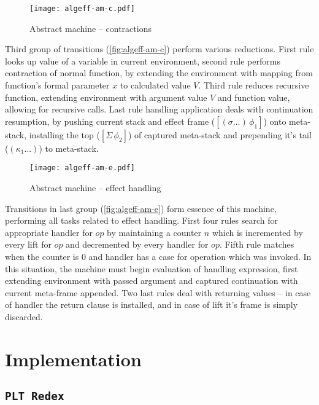\documentclass[inz, english, shortabstract]{iithesis}
\newcommand{\Redex}{\texttt{PLT Redex}}
\begin{document}
\begin{figure}[h]
  \centering 
  \texttt{[image: algeff-am-c.pdf]}
  \caption{Abstract machine -- contractions}
  \label{fig:algeff-am-c}
\end{figure}

Third group of transitions (\autoref{fig:algeff-am-c}) perform various reductions.
First rule looks up value of a variable in current environment, second rule performs contraction of normal function, by extending the environment with mapping from function's formal parameter $ x $ to calculated value $ V $.
Third rule reduces recursive function, extending environment with argument value $ V $ and function value, allowing for recursive calls.
Last rule handling application deals with continuation resumption, by pushing current stack and effect frame ($ [(\sigma \ldots) \, \phi_1] $) onto meta-stack, installing the top ($ [\Sigma \, \phi_2] $) of captured meta-stack and prepending it's tail ($ (\kappa_1 \ldots) $) to meta-stack.

\begin{figure}[h]
  \centering
  \texttt{[image: algeff-am-e.pdf]}
  \caption{Abstract machine -- effect handling}
  \label{fig:algeff-am-e}
\end{figure}

Transitions in last group (\autoref{fig:algeff-am-e}) form essence of this machine, performing all tasks related to effect handling.
First four rules search for appropriate handler for $ op $ by maintaining a counter $ n $ which is incremented by every lift for $ op $ and decremented by every handler for $ op $.
Fifth rule matches when the counter is $ 0 $ and handler has a case for operation which was invoked. 
In this situation, the machine must begin evaluation of handling expression, first extending environment with passed argument and captured continuation with current meta-frame appended.
Two last rules deal with returning values -- in case of handler the return clause is installed, and in case of lift it's frame is simply discarded.

\chapter{Implementation}\label{ch:implementation}

\section{\Redex}
\end{document}
